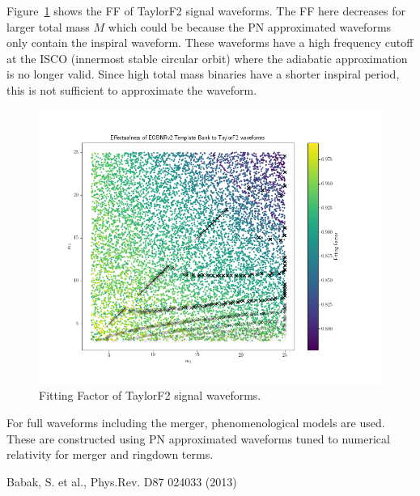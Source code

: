 \documentclass{article}
\begin{document}
Figure~\ref{fig:effectualnessTaylorF2} shows the FF of TaylorF2 signal waveforms. The FF here decreases for larger total mass $M$ which could be because the PN approximated waveforms only contain the inspiral
waveform. These waveforms have a high frequency cutoff at the ISCO
(innermost stable circular orbit) where the adiabatic approximation
is no longer valid. Since high total mass binaries have a shorter
inspiral period, this is not sufficient to approximate the waveform.
\begin{figure}[h!]
    \centering
    \includegraphics[scale=0.3]{EffectualnessTaylorF2.png}
    \caption{Fitting Factor of TaylorF2 signal waveforms.
    \label{fig:effectualnessTaylorF2}}
\end{figure}

For full waveforms including the merger, phenomenological models are used. These are constructed using PN approximated waveforms tuned to numerical relativity for merger and ringdown terms. 


\begin{thebibliography}{1}
 Babak, S. et al., Phys.Rev. D87 024033 (2013)
\end{thebibliography}
\end{document}
